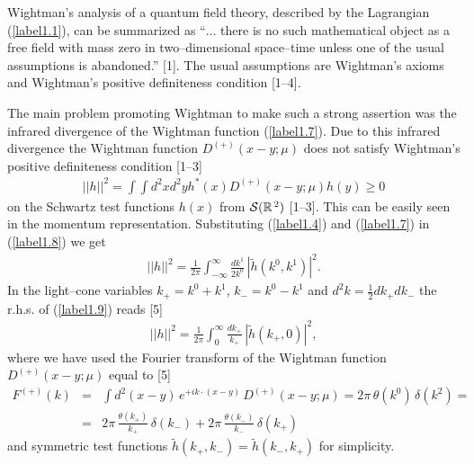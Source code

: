 \documentclass[a4paper,12pt] {article}
\begin{document}
Wightman's analysis of a quantum field theory, described by the
Lagrangian (\ref{label1.1}), can be summarized as ``$\ldots$ there is
no such mathematical object as a free field with mass zero in
two--dimensional space--time unless one of the usual assumptions is
abandoned.''  [1]. The usual assumptions are Wightman's axioms and
Wightman's positive definiteness condition [1--4].

The main problem promoting Wightman to make such a strong assertion
was the infrared divergence of the Wightman function (\ref{label1.7}).
Due to this infrared divergence the Wightman function $D^{(+)}(x -
y;\mu)$ does not satisfy Wightman's positive definiteness condition
[1--3]
%
\begin{eqnarray}\label{label1.8}
||h||^2 = \int\!\!\!\int d^2xd^2y h^*(x) D^{(+)}(x-y;\mu) h(y) \ge 0
\end{eqnarray}
%
on the Schwartz test functions $h(x)$ from ${\cal
S}(\mathbb{R}^{\,2})$ [1--3]. This can be easily seen in the momentum
representation. Substituting (\ref{label1.4}) and (\ref{label1.7}) in
(\ref{label1.8}) we get
%
\begin{eqnarray}\label{label1.9}
||h||^2 = \frac{1}{2\pi}\int^{\infty}_{-\infty}
\frac{dk^1}{2k^0}\,|\tilde{h}(k^0, k^1)|^2.
\end{eqnarray}
%
In the light--cone variables $k_+ = k^0 + k^1$, $k_- = k^0 - k^1$ and
$d^2k = \frac{1}{2}dk_+dk_-$ the r.h.s. of (\ref{label1.9}) reads [5]
%
\begin{eqnarray}\label{label1.10}
||h||^2 =
\frac{1}{2\pi}\int^{\infty}_0\frac{dk_+}{k_+}\,|\tilde{h}(k_+, 0)|^2,
\end{eqnarray}
%
where we have used the Fourier transform of the Wightman function
$D^{(+)}(x-y; \mu)$ equal to [5]
%
\begin{eqnarray}\label{label1.11}
F^{(+)}(k) &=& \int d^2(x-y)\,e^{\textstyle
 +ik\cdot(x-y)}\,D^{(+)}(x-y; \mu) = 2\pi\,\theta(k^0)\,\delta(k^2)
 =\nonumber\\ &=& 2\pi\,\frac{\theta(k_+)}{k_+}\,\delta(k_-) +
 2\pi\,\frac{\theta(k_-)}{k_-}\,\delta(k_+)
\end{eqnarray}
%
and symmetric test functions $\tilde{h}(k_+, k_-) = \tilde{h}(k_-,
k_+)$ for simplicity.  
\end{document}
